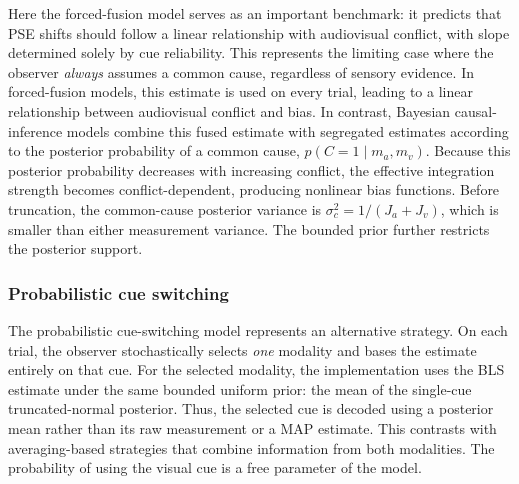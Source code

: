 \documentclass{biorxiv}
\begin{document}
Here the forced-fusion model serves as an important benchmark: it predicts that PSE shifts should follow a linear relationship with audiovisual conflict, with slope determined solely by cue reliability. This represents the limiting case where the observer \textit{always} assumes a common cause, regardless of sensory evidence. 
In forced-fusion models, this estimate is used on every trial, leading to a linear relationship between audiovisual conflict and bias. In contrast, Bayesian causal-inference models combine this fused estimate with segregated estimates according to the posterior probability of a common cause, $p(C=1 \mid m_a,m_v)$. Because this posterior probability decreases with increasing conflict, the effective integration strength becomes conflict-dependent, producing nonlinear bias functions.
Before truncation, the common-cause posterior variance is $\sigma_c^2=1/(J_a+J_v)$, which is smaller than either measurement variance. The bounded prior further restricts the posterior support.

\subsubsection{Probabilistic cue switching}

The probabilistic cue-switching model represents an alternative strategy. On each trial, the observer stochastically selects \textit{one} modality and bases the estimate entirely on that cue. For the selected modality, the implementation uses the BLS estimate under the same bounded uniform prior: the mean of the single-cue truncated-normal posterior. Thus, the selected cue is decoded using a posterior mean rather than its raw measurement or a MAP estimate. This contrasts with averaging-based strategies that combine information from both modalities. The probability of using the visual cue is a free parameter of the model.


\end{document}
